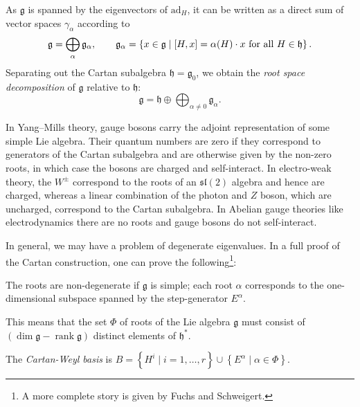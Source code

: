 \begin{leftbar}
  As $\mathfrak{g}$ is spanned by the eigenvectors of $\text{ad}_H$, it can be written as a direct sum of vector spaces $\gamma_{\alpha}$ according to
  \begin{equation}
    \mathfrak{g} = \bigoplus_{\alpha} \mathfrak{g}_{\alpha}, \qquad \mathfrak{g}_{\alpha} = \left\{x \in \mathfrak{g} \suchthat [H, x] = \alpha(H) \cdot x \text{ for all } H \in \mathfrak{h} \right\}.
  \end{equation}
  Separating out the Cartan subalgebra $\mathfrak{h} = \mathfrak{g}_0$, we obtain the \emph{root space decomposition} of $\mathfrak{g}$ relative to $\mathfrak{h}$:
  \begin{equation}
    \mathfrak{g} = \mathfrak{h} \oplus \bigoplus_{\alpha \neq 0} \mathfrak{g}_{\alpha}.
  \end{equation}
  \begin{remark}
    In Yang--Mills theory, gauge bosons carry the adjoint representation of some simple Lie algebra. Their quantum numbers are zero if they correspond to generators of the Cartan subalgebra and are otherwise given by the non-zero roots, in which case the bosons are charged and self-interact.
    In electro-weak theory, the $W^{\pm}$ correspond to the roots of an $\mathfrak{sl}(2)$ algebra and hence are charged, whereas a linear combination of the photon and $Z$ boson, which are uncharged, correspond to the Cartan subalgebra. In Abelian gauge theories like electrodynamics there are no roots and gauge bosons do not self-interact.
  \end{remark}
\end{leftbar}

In general, we may have a problem of degenerate eigenvalues.  In a full proof of the Cartan construction, one can prove the following\footnote{A more complete story is given by Fuchs and Schweigert.}:
\begin{claim}
  \label{cl:non-deg}
  The roots are non-degenerate if $\mathfrak{g}$ is simple; each root $\alpha$ corresponds to the one-dimensional subspace spanned by the step-generator $E^{\alpha}$.
\end{claim}
\begin{corollary}
  This means that the set $\Phi$ of roots of the Lie algebra $\mathfrak{g}$ must consist of $(\dim \mathfrak{g} - \operatorname{rank} \mathfrak{g})$ distinct elements of $\mathfrak{h}^*$.
\end{corollary}
\begin{definition}[]
  The \emph{Cartan-Weyl basis} is $B = \left\{ H^{i} \mid i=1, \dots, r \right\} \cup \left\{ E^{\alpha} \mid \alpha \in \Phi \right\}$.
\end{definition}

